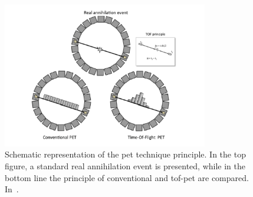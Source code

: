 \begin{figure}[!htbp]
\centering
\includegraphics[width=0.8\textwidth]{03_GraphicFiles/chapter1_Introduction/PET_concept.pdf}
\caption{Schematic representation of the \gls{pet} technique principle. In the top figure, a standard real annihilation event is presented, while in the bottom line the principle of conventional and \gls{tof}-\gls{pet} are compared. In~\cite{Vandenberghe2016}.}
\label{chap1::fig::PETconcept}
\end{figure}   

